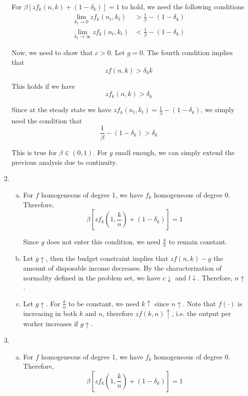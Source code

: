 \documentclass[12pt]{article}
\newcommand{\1}{{\bf 1}} %
\begin{document}
\begin{enumerate}[(1)]
	For $\beta [ zf_k(n,k)+(1-\delta_k)] =1$ to hold, we need the following conditions
	\begin{align*}
	\lim_{k_t\to 0} zf_k(n_t,k_t)& > \frac{1}{\beta}-(1-\delta_k)\\
	\lim_{k_t\to \infty} zf_k(n_t,k_t)&<\frac{1}{\beta}-(1-\delta_k)
	\end{align*}
	
	
	Now, we need to show that $c>0$. Let $g=0$. The fourth condition implies that
	\[
	zf(n,k)>\delta_k k
	\]
	
	This holds if we have
		\[
	zf_k(n,k)>\delta_k 
	\]
	
	Since at the steady state we have $ zf_k(n_t,k_t)= \frac{1}{\beta}-(1-\delta_k)$, we simply need the condition that 
	\[
	\frac{1}{\beta}-(1-\delta_k)>\delta_k
	\]
	
	This is true for $\beta\in (0,1)$. For $g$ small enough, we can simply extend the previous analysis due to continuity.
	
	\item 
		\begin{enumerate}[(a)]
			\item 
			For $f$ homogeneous of degree 1, we have $f_k$ homogeneous of degree 0. Therefore,
			\[
			\beta \left[  zf_k\left( 1,\frac{k}{n}\right) +(1-\delta_k)\right]  =1
			\]
			
			Since $g$ does not enter this condition, we need $\frac{k}{n}$ to remain constant.
			\item 
			
		Let $g\uparrow$, then the budget constraint implies that $zf(n,k)-g$ the amount of disposable income decreases. By the characterization of normality defined in the problem set, we have $c \downarrow$ and $l \downarrow$. Therefore, $n\uparrow$.
			\item 
			
				Let $g\uparrow$. For $\frac{k}{n}$ to be constant, we need $k\uparrow$ since  $n\uparrow$. Note that $f(\cdot)$ is increasing in both $k$ and $n$, therefore $zf(k,n)\uparrow$, i.e. the output per worker increases if $g\uparrow$.
		\end{enumerate}
	\item 
		\begin{enumerate}[(a)]
			\item 
			
						For $f$ homogeneous of degree 1, we have $f_k$ homogeneous of degree 0. Therefore,
			\[
			\beta \left[  zf_k\left( 1,\frac{k}{n}\right) +(1-\delta_k)\right]  =1
			\]
			

\end{enumerate}
\end{enumerate}
\end{document}
